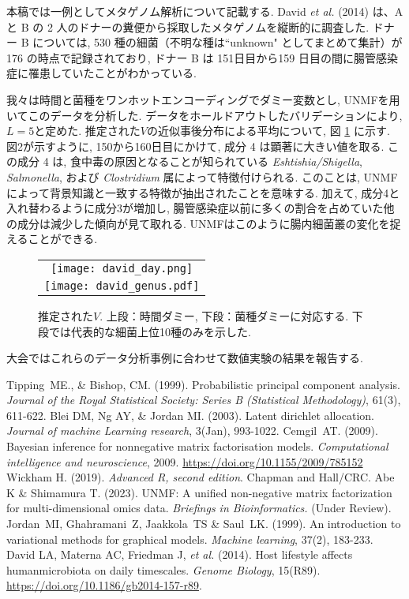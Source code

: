 \documentclass[a4paper,12ptc, dvipdfmx]{jsarticle} %
\begin{document}
本稿では一例としてメタゲノム解析について記載する. David \textit{et al.} (2014) は、A と B の 2 人のドナーの糞便から採取したメタゲノムを縦断的に調査した.  ドナー B については, 530 種の細菌（不明な種は``unknown" としてまとめて集計）が 176 の時点で記録されており, ドナー B は 151日目から159 日目の間に腸管感染症に罹患していたことがわかっている.

我々は時間と菌種をワンホットエンコーディングでダミー変数とし, UNMFを用いてこのデータを分析した. データをホールドアウトしたバリデーションにより, $L=5$と定めた. 推定された$V$の近似事後分布による平均について, 図 \ref{Vplot} に示す. 図2が示すように, 150から160日目にかけて, 成分 4 は顕著に大きい値を取る. この成分 4 は, 食中毒の原因となることが知られている \textit{Eshtishia/Shigella}, \textit{Salmonella}, および \textit{Clostridium} 属によって特徴付けられる. このことは, UNMFによって背景知識と一致する特徴が抽出されたことを意味する. 
加えて, 成分4と入れ替わるように成分3が増加し, 腸管感染症以前に多くの割合を占めていた他の成分は減少した傾向が見て取れる. UNMFはこのように腸内細菌叢の変化を捉えることができる. 

\begin{figure}
\centering
\begin{tabular}{c}
\texttt{[image: david\_day.png]} \\
\texttt{[image: david\_genus.pdf]}
\end{tabular}
\caption{推定された$V$. 上段：時間ダミー, 下段：菌種ダミーに対応する. 下段では代表的な細菌上位10種のみを示した.\label{Vplot}}
\end{figure}

大会ではこれらのデータ分析事例に合わせて数値実験の結果を報告する.

\begin{thebibliography}{9}
 Tipping~ME., \& Bishop, CM. (1999).  Probabilistic principal component analysis. {\em Journal of the Royal Statistical Society: Series B (Statistical Methodology)}, 61(3), 611-622.
 Blei DM, Ng AY, \& Jordan MI. (2003). Latent dirichlet allocation. {\em Journal of machine Learning research}, 3(Jan), 993-1022.
 Cemgil~AT. (2009).  Bayesian inference for nonnegative matrix factorisation models. {\em Computational intelligence and neuroscience}, 2009.  \url{https://doi.org/10.1155/2009/785152}
 Wickham H. (2019).  {\em Advanced R, second edition}. Chapman and Hall/CRC.
 Abe K \& Shimamura T. (2023). UNMF: A unified non-negative matrix factorization for multi-dimensional omics data. {\em Briefings in Bioinformatics.} (Under Review).
 Jordan~MI, Ghahramani~Z, Jaakkola~TS \& Saul~LK. (1999). An introduction to variational methods for graphical models. {\em Machine learning}, 37(2), 183-233.
 David LA, Materna AC, Friedman J, \textit{et al.} (2014). Host lifestyle affects humanmicrobiota on daily timescales. {\em Genome Biology}, 15(R89). \url{https://doi.org/10.1186/gb2014-157-r89}.
\end{thebibliography}
\end{document}
